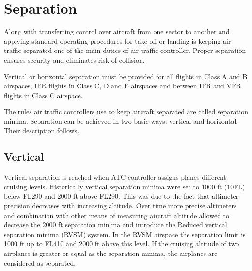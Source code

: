 





\section{Separation}

Along with transferring control over aircraft from one sector to another and applying standard operating procedures for take-off or landing is keeping air traffic separated one of the main duties of air traffic controller. Proper separation ensures security and eliminates risk of collision. \cite[Chapter 2]{order7110}

Vertical or horizontal separation must be provided for all flights in Class A and B airspaces, IFR flights in Class C, D and E airspaces and between IFR and VFR flights in Class C airspace. \cite[Chapter 5]{doc4444}

The rules air traffic controllers use to keep aircraft separated are called separation minima. Separation can be achieved in two basic ways: vertical and horizontal. Their description follows.

\subsection{Vertical}

Vertical separation is reached when ATC controller assigns planes different cruising levels. Historically vertical separation minima were set to 1000 ft (10FL) below FL290 and 2000 ft above FL290. This was due to the fact that altimeter precision decreases with increasing altitude. Over time more precise altimeters and combination with other means of measuring aircraft altitude allowed to decrease the 2000 ft separation minima and introduce the Reduced vertical separation minima (RVSM) system. In the RVSM airspace the separation limit is 1000 ft up to FL410 and 2000 ft above this level. If the cruising altitude of two airplanes is greater or equal as the separation minima, the airplanes are considered as separated. \cite{aim}


